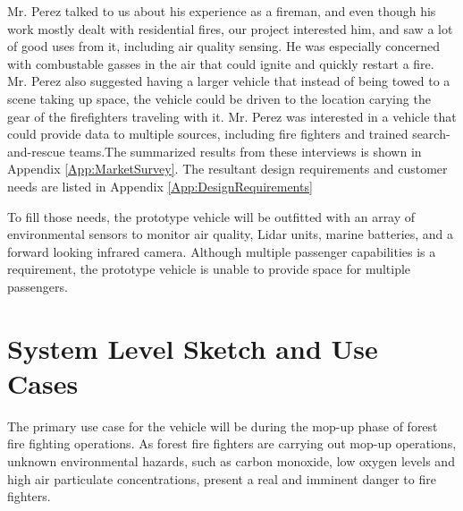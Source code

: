Mr. Perez talked to us about his experience as a fireman, and even though his work mostly dealt with residential fires, our project interested him, and saw a lot of good uses from it, including air quality sensing. He was especially concerned with combustable gasses in the air that could ignite and quickly restart a fire. Mr. Perez also suggested having a larger vehicle that instead of being towed to a scene taking up space, the vehicle could be driven to the location carying the gear of the firefighters traveling with it. Mr. Perez was interested in a vehicle that could provide data to multiple sources, including fire fighters and trained search-and-rescue teams.The summarized results from these interviews is shown in Appendix \ref{App:MarketSurvey}. The resultant design requirements and customer needs are listed in Appendix \ref{App:DesignRequirements} 

To fill those needs, the prototype vehicle will be outfitted with an array of environmental sensors to monitor air quality, Lidar units, marine batteries, and a forward looking infrared camera. Although multiple passenger capabilities is a requirement, the prototype vehicle is unable to provide space for multiple passengers.

%
\section{System Level Sketch and Use Cases}
The primary use case for the vehicle will be during the mop-up phase of forest fire fighting operations. As forest fire fighters are carrying out mop-up operations, unknown environmental hazards, such as carbon monoxide, low oxygen levels and high air particulate concentrations,  present a real and imminent danger to fire fighters. 


